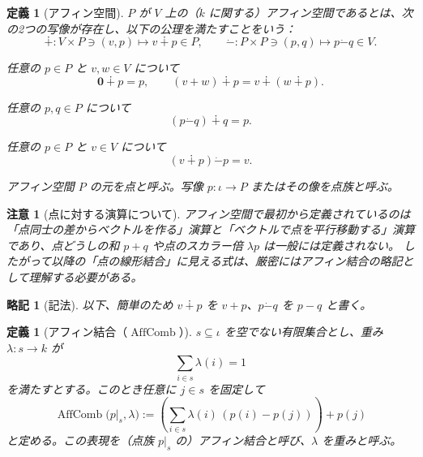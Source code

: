 \documentclass[a4paper,12pt]{bxjsbook}
\theoremstyle{theorem}
\newtheorem{definition}[theorem]{定義}
\newtheorem{remark}[theorem]{注意}
\newtheorem{abbreviation}[theorem]{略記}
\newcommand{\dotminus}{\mathbin{\dot{-}}}
\DeclareMathOperator{\AffComb}{AffComb}
\begin{document}
    \begin{definition}[アフィン空間]
        $P$ が $V$ 上の（$k$ に関する）\emph{アフィン空間}であるとは、次の2つの写像が存在し、以下の公理を満たすことをいう：
        \[
        \dotplus : V\times P \ni (v,p) \mapsto v \dotplus p \in P,
        \qquad
        \dotminus : P\times P \ni (p,q) \mapsto p \dotminus q \in V.
        \]
        \begin{theoremitemize}[leftmargin=5em, topsep=2pt, partopsep=0pt, itemsep=0pt, parsep=0pt]
            \item 任意の $p\in P$ と $v,w\in V$ について
            \[
              \mathbf 0 \dotplus p = p,
              \qquad
              (v+w)\dotplus p = v\dotplus (w\dotplus p).
            \]
            \item 任意の $p,q\in P$ について
            \[
              (p\dotminus q)\dotplus q = p.
            \]
            \item 任意の $p\in P$ と $v\in V$ について
            \[
              (v\dotplus p)\dotminus p = v.
            \]
        \end{theoremitemize}
        アフィン空間 $P$ の元を\emph{点}と呼ぶ。写像 $p:\iota\to P$ またはその像を\emph{点族}と呼ぶ。
    \end{definition}

    \begin{remark}[点に対する演算について]
        アフィン空間で最初から定義されているのは「点同士の差からベクトルを作る」演算と「ベクトルで点を平行移動する」演算であり、点どうしの和 $p+q$ や点のスカラー倍 $\lambda p$ は一般には定義されない。
        したがって以降の「点の線形結合」に見える式は、厳密にはアフィン結合の略記として理解する必要がある。
    \end{remark}

    \begin{abbreviation}[記法]
        以下、簡単のため $v\dotplus p$ を $v+p$、$p\dotminus q$ を $p-q$ と書く。
    \end{abbreviation}

    \begin{definition}[アフィン結合（\texorpdfstring{$\AffComb$}{AffComb}）]
        $s\subseteq \iota$ を空でない有限集合とし、重み $\lambda:s\to k$ が
        \[
          \sum_{i\in s}\lambda(i)=1
        \]
        を満たすとする。このとき任意に $j\in s$ を固定して
        \[
          \AffComb\bigl(p|_s,\lambda\bigr)
          :=
          \left(\sum_{i\in s}\lambda(i)\,(p(i)-p(j))\right)+p(j)
        \]
        と定める。この表現を（点族 $p|_s$ の）\emph{アフィン結合}と呼び、$\lambda$ を\emph{重み}と呼ぶ。
    \end{definition}
\end{document}
